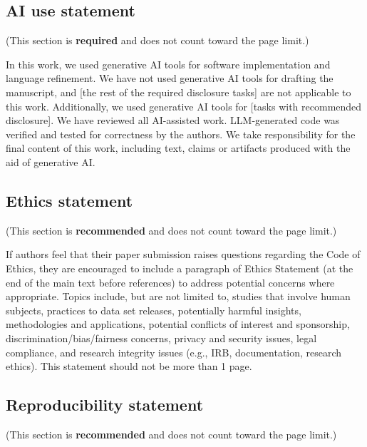 \documentclass{article} %
\begin{document}



\subsection*{AI use statement}

(This section is \textbf{required} and does not count toward the page limit.)

In this work, we used generative AI tools for software implementation and language refinement.
We have not used generative AI tools for drafting the manuscript,
and [the rest of the required disclosure tasks] are not applicable to this work.
Additionally, we used generative AI tools for [tasks with recommended
disclosure]. We have reviewed all AI-assisted work. LLM-generated code was verified and tested for correctness
by the authors. We take responsibility for the final content of this work,
including text, claims or artifacts produced with the aid of generative AI.


\subsection*{Ethics statement}

(This section is \textbf{recommended} and does not count toward the page limit.)

If authors feel that their paper submission raises questions regarding the Code
of Ethics, they are encouraged to include a paragraph of Ethics Statement (at
the end of the main text before references) to address potential concerns where
appropriate. Topics include, but are not limited to, studies that involve human
subjects, practices to data set releases, potentially harmful insights,
methodologies and applications, potential conflicts of interest and sponsorship,
discrimination/bias/fairness concerns, privacy and security issues, legal
compliance, and research integrity issues (e.g., IRB, documentation, research
ethics). This statement should not be more than 1 page.

\subsection*{Reproducibility statement}

(This section is \textbf{recommended} and does not count toward the page limit.)
\end{document}
